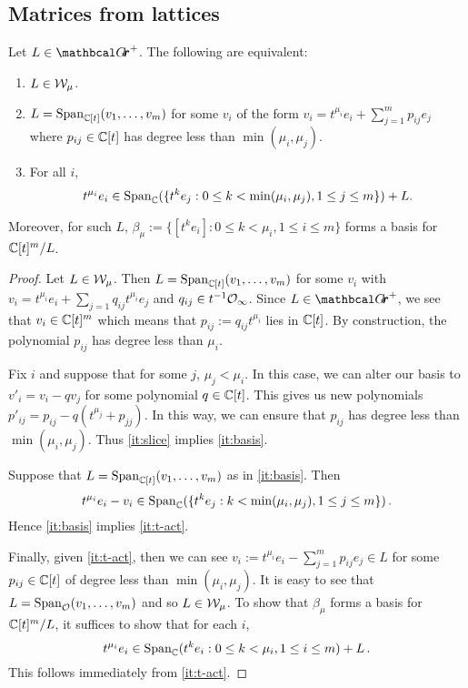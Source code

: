 \documentclass{article}
\begin{document}
\subsection{Matrices from lattices}
\label{ss:mvyisos}

\begin{lemma} 
\label{le:Wmu}
Let $ L \in \Grth^+$.  The following are equivalent:
\begin{enumerate}[label=(\roman*)]
    \item \label{it:slice} $ L \in \mathcal W_\mu$.
    \item \label{it:basis} $ L = \operatorname{Span}_{\mathbb C[t]}(v_1, \dots, v_m)$ for some $ v_i $ of the form $ v_i = t^{\mu_i} e_i + \sum_{j=1}^m p_{ij} e_j $ where $ p_{ij} \in \mathbb C[t] $ has degree less than $ \min(\mu_i, \mu_j)$.
    \item \label{it:t-act} For all $ i $, 
    $$ t^{\mu_i} e_i \in \operatorname{Span}_\mathbb C(\{t^k e_j : 0 \le k < \min(\mu_i, \mu_j), 1 \le j \le m \}) + L. $$
\end{enumerate}
Moreover, for such $L $, $ \beta_\mu := \{ [t^k e_i] : 0 \le k < \mu_i, 1 \le i \le m\}$ forms a basis for $ \mathbb C[t]^m/L$. 
\end{lemma}
% 
\begin{proof}
    Let $ L \in \mathcal W_\mu$.  Then $ L = \operatorname{Span}_{\mathbb C[t]}(v_1, \dots, v_m) $ for some $ v_i $ with $ v_i = t^{\mu_i} e_i + \sum_{j=1} q_{ij}t^{\mu_i} e_j $ and $ q_{ij} \in t^{-1} \mathcal O_\infty$.  Since $ L \in \Grth^+ $, we see that $ v_i \in \mathbb C[t]^m$ which means that $ p_{ij} := q_{ij}t^{\mu_i} $ lies in $ \mathbb C[t]$.  By construction, the polynomial $ p_{ij}$ has degree less than $ \mu_i$.
    
    Fix $ i$ and suppose that for some $ j$, $ \mu_j < \mu_i$.  In this case, we can alter our basis to $ v'_i = v_i - q v_j$ for some polynomial $q \in \mathbb C[t]$.  
    This gives us new polynomials $ p'_{ij} = p_{ij} - q (t^{\mu_j} + p_{jj}) $.  In this way, we can ensure that $ p_{ij} $ has degree less than $ \min(\mu_i, \mu_j)$.  
    Thus \cref{it:slice} implies \cref{it:basis}.
    
    Suppose that $ L = \operatorname{Span}_{\mathbb C[t]}(v_1, \dots, v_m)$ as in \cref{it:basis}.  Then
    $$t^{\mu_i} e_i - v_i \in \operatorname{Span}_\mathbb C(\{t^k e_j :  k < \min(\mu_i, \mu_j), 1 \le j \le m \})  \,. $$
    Hence \cref{it:basis} implies \cref{it:t-act}.  

    Finally, given \cref{it:t-act}, then we can see $ v_i := t^{\mu_i} e_i - \sum_{j=1}^m p_{ij} e_j \in L $ for some $ p_{ij} \in \mathbb C[t]$ of degree less than $ \min(\mu_i,\mu_j) $.  It is easy to see that $ L = \operatorname{Span}_\mathcal O(v_1, \dots, v_m) $ and so $ L \in \mathcal W_\mu$.  
    To show that $ \beta_\mu$ forms a basis for $ \mathbb C[t]^m/L$, it suffices to show that for each $ i$, 
    $$ t^{\mu_i} e_i  \in \operatorname{Span}_\mathbb C(  t^k e_i : 0 \le k < \mu_i, 1 \le i \le m) + L\,.$$ This follows immediately from \cref{it:t-act}.
\end{proof}
% 
\end{document}
